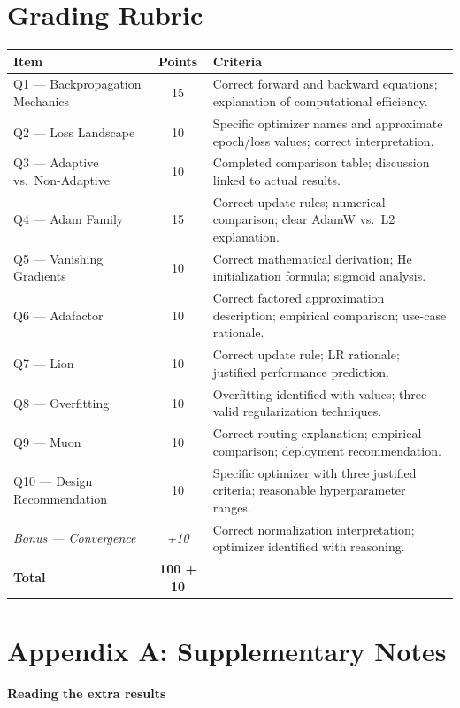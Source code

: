 \documentclass[12pt,a4paper]{article}
\begin{document}
\section*{Grading Rubric}

\begin{center}
\renewcommand{\arraystretch}{1.3}
\begin{tabular}{|p{4cm}|c|p{9cm}|}
\hline
\textbf{Item} & \textbf{Points} & \textbf{Criteria} \\
\hline
Q1 — Backpropagation Mechanics & 15 &
  Correct forward and backward equations; explanation of computational efficiency. \\
\hline
Q2 — Loss Landscape & 10 &
  Specific optimizer names and approximate epoch/loss values; correct interpretation. \\
\hline
Q3 — Adaptive vs.\ Non-Adaptive & 10 &
  Completed comparison table; discussion linked to actual results. \\
\hline
Q4 — Adam Family & 15 &
  Correct update rules; numerical comparison; clear AdamW vs.\ L2 explanation. \\
\hline
Q5 — Vanishing Gradients & 10 &
  Correct mathematical derivation; He initialization formula; sigmoid analysis. \\
\hline
Q6 — Adafactor & 10 &
  Correct factored approximation description; empirical comparison; use-case rationale. \\
\hline
Q7 — Lion & 10 &
  Correct update rule; LR rationale; justified performance prediction. \\
\hline
Q8 — Overfitting & 10 &
  Overfitting identified with values; three valid regularization techniques. \\
\hline
Q9 — Muon & 10 &
  Correct routing explanation; empirical comparison; deployment recommendation. \\
\hline
Q10 — Design Recommendation & 10 &
  Specific optimizer with three justified criteria; reasonable hyperparameter ranges. \\
\hline
\textit{Bonus — Convergence} & \textit{+10} &
  Correct normalization interpretation; optimizer identified with reasoning. \\
\hline
\textbf{Total} & \textbf{100 + 10} & \\
\hline
\end{tabular}
\end{center}


\clearpage
\section*{Appendix A: Supplementary Notes}
\textbf{Reading the extra results}
\end{document}
